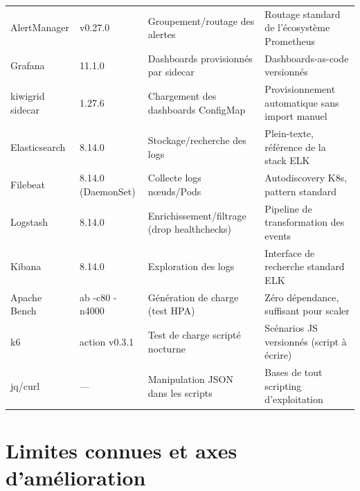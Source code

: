 \documentclass[11pt,a4paper]{article}
\begin{document}
{\begin{longtable}{@{}p{3.1cm}p{2.0cm}p{4.6cm}p{4.6cm}@{}}
AlertManager & v0.27.0 & Groupement/routage des alertes & Routage standard de l'écosystème Prometheus \\
Grafana & 11.1.0 & Dashboards provisionnés par sidecar & Dashboards-as-code versionnés \\
kiwigrid sidecar & 1.27.6 & Chargement des dashboards ConfigMap & Provisionnement automatique sans import manuel \\
Elasticsearch & 8.14.0 & Stockage/recherche des logs & Plein-texte, référence de la stack ELK \\
Filebeat & 8.14.0 (DaemonSet) & Collecte logs nœuds/Pods & Autodiscovery K8s, pattern standard \\
Logstash & 8.14.0 & Enrichissement/filtrage (drop healthchecks) & Pipeline de transformation des events \\
Kibana & 8.14.0 & Exploration des logs & Interface de recherche standard ELK \\
Apache Bench & ab -c80 -n4000 & Génération de charge (test HPA) & Zéro dépendance, suffisant pour scaler \\
k6 & action v0.3.1 & Test de charge scripté nocturne & Scénarios JS versionnés (script à écrire) \\
jq/curl & --- & Manipulation JSON dans les scripts & Bases de tout scripting d'exploitation \\
\end{longtable}
}

\section{Limites connues et axes d'amélioration}
\end{document}

